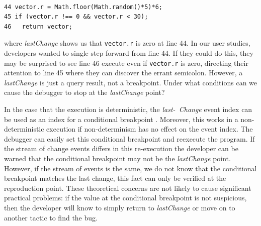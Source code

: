 \documentclass{sig-alternate}
\begin{document}
\lstset{basicstyle=\scriptsize}
\begin{lstlisting}[frame=single, language=myLang] % framerule=0pt]

44 vector.r = Math.floor(Math.random()*5)*6;
45 if (vector.r !== 0 && vector.r < 30);
46   return vector;
\end{lstlisting}
where \textit{lastChange} shows us that \texttt{vector.r} is zero at line 44. In our user studies, developers
wanted to single step forward from line 44. If they could do this, they may be surprised to see line 46 execute 
even if \texttt{vector.r} is zero, directing their attention to line 45 where they can discover the errant semicolon.
However, a \textit{lastChange} is just a query result, not a breakpoint. Under what conditions can we 
cause the debugger to stop at the \textit{lastChange} point?

In the case that the execution is deterministic, the \textit{last-\ Change}
event index can be used as an index for a conditional breakpoint \cite{Boothe, Maruyama}. 
Moreover, this works in a non-deterministic execution if non-determinism
has no effect on the event index.  The debugger can easily set this conditional breakpoint
and reexecute the program. If the stream of change events differs in this re-execution the
developer can be warned that the conditional breakpoint may not be the \textit{lastChange} point.
However, if the stream of events is the same, we do not know that the 
conditional breakpoint matches the last 
change, this fact can only be verified at the reproduction point. These theoretical concerns are not
likely to cause significant practical problems: if the value at the conditional breakpoint is not suspicious, 
then the developer will know to simply return to \textit{lastChange} or move on to another tactic to find the bug.

\end{document}
